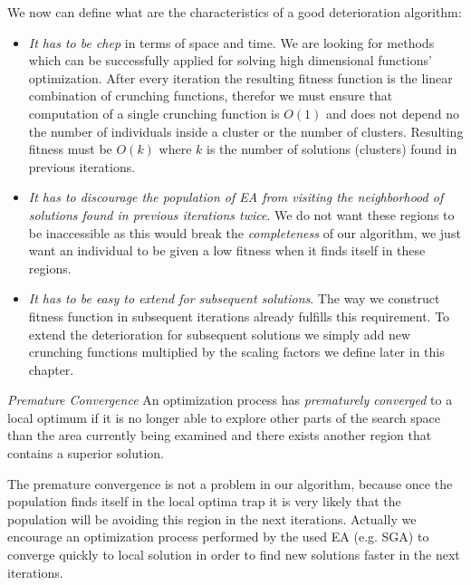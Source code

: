 We now can define what are the characteristics of a good deterioration
algorithm:
\begin{itemize}
  \item \textit{It has to be chep} in terms of space and time. We are looking
  for methods which can be successfully applied for solving high
  dimensional functions' optimization. After every iteration the resulting
  fitness function is the linear combination of crunching functions, therefor we
  must ensure that computation of a single crunching function is $O(1)$ and does 
  not depend no the number of individuals inside a cluster or the number of
  clusters. Resulting fitness must be $O(k)$ where $k$ is the number of
  solutions (clusters) found in previous iterations.
  
  \item \textit{It has to discourage the population of EA from visiting the
  neighborhood of solutions found in previous iterations twice}. We do not want
  these regions to be inaccessible as this would break the \textit{completeness} 
  of our algorithm, we just want an individual to be given a low fitness when it
  finds itself in these regions.
  
  \item \textit{It has to be easy to extend for subsequent solutions}. The way
  we construct fitness function in subsequent iterations already fulfills
  this requirement. To extend the deterioration for subsequent solutions we
  simply add new crunching functions multiplied by the scaling factors we define
  later in this chapter. 
\end{itemize}


\begin{definition}\label{premature-convergence}
\textit{Premature Convergence} \cite{PardalosRomeijn2002} An optimization process has
\textit{prematurely converged} to a local optimum if it is no longer able to explore 
other parts of the search space than the area currently being examined and there 
exists another region that contains a superior solution.
\end{definition}

The premature convergence is not a problem in our algorithm, because once the
population finds itself in the local optima trap it is very likely that the
population will be avoiding this region in the next iterations. Actually we
encourage an optimization process performed by the used EA (e.g. SGA) 
to converge quickly to local solution in order to find new solutions 
faster in the next iterations. 

